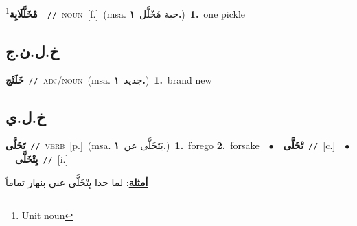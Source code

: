 \documentclass[10pt,a4paper,twoside]{article} %
\begin{document}
\begin{multicols}{2}
{\setlength\topsep{0pt}\textbf{\foreignlanguage{arabic}{مْخَلَّلَايِة}}\footnote{Unit noun}\ \ {\color{gray}\texttt{//}\color{black}}\ \textsc{noun}\ [f.]\ \color{gray}(msa. \foreignlanguage{arabic}{حبة مُخَْلَّل}~\foreignlanguage{arabic}{\textbf{١.}})\color{black}\ \textbf{1.}~one pickle\ } \vspace{2mm}

\vspace{-3mm}
\subsection*{\color{blue}\foreignlanguage{arabic}{خ.ل.ن.ج}\color{blue}{ (ntws)}} 

{\setlength\topsep{0pt}\textbf{\foreignlanguage{arabic}{خَلَنْج}}\ {\color{gray}\texttt{//}\color{black}}\ \textsc{adj/noun}\ \color{gray}(msa. \foreignlanguage{arabic}{جديد}~\foreignlanguage{arabic}{\textbf{١.}})\color{black}\ \textbf{1.}~brand new\ } \vspace{2mm}

\vspace{-3mm}
\subsection*{\color{blue}\foreignlanguage{arabic}{خ.ل.ي}\color{blue}{}} 

{\setlength\topsep{0pt}\textbf{\foreignlanguage{arabic}{تَخَلَّى}}\ {\color{gray}\texttt{//}\color{black}}\ \textsc{verb}\ [p.]\ \color{gray}(msa. \foreignlanguage{arabic}{يَتَخَلَّى عن}~\foreignlanguage{arabic}{\textbf{١.}})\color{black}\ \textbf{1.}~forego  \textbf{2.}~forsake\ \ $\bullet$\ \ \setlength\topsep{0pt}\textbf{\foreignlanguage{arabic}{تْخَلَّى}}\ {\color{gray}\texttt{//}\color{black}}\ [c.]\ \ $\bullet$\ \ \setlength\topsep{0pt}\textbf{\foreignlanguage{arabic}{يِتْخَلَّى}}\ {\color{gray}\texttt{//}\color{black}}\ [i.]\  \begin{flushright}\color{gray}\foreignlanguage{arabic}{\textbf{\underline{\foreignlanguage{arabic}{أمثلة}}}: لما حدا يِتْخَلَّى عني بنهار تماماً}\end{flushright}\color{black}} \vspace{2mm}


\end{multicols}
\end{document}
